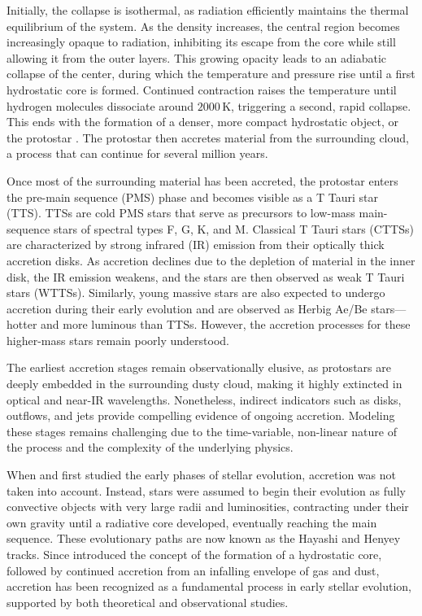 \documentclass[12pt,a4paper]{article}
\newcommand{\mr}{\mathrm}
\begin{document}
Initially, the collapse is isothermal, as radiation efficiently maintains the thermal equilibrium of the system. As the density increases, the central region becomes increasingly opaque to radiation, inhibiting its escape from the core while still allowing it from the outer layers. This growing opacity leads to an adiabatic collapse of the center, during which the temperature and pressure rise until a first hydrostatic core is formed. Continued contraction raises the temperature until hydrogen molecules dissociate around $2000\,\mr{K}$, triggering a second, rapid collapse. This ends with the formation of a denser, more compact hydrostatic object, or the protostar \parencite[e.g., ][]{StahlerPalla2004}. The protostar then accretes material from the surrounding cloud, a process that can continue for several million years. 

Once most of the surrounding material has been accreted, the protostar enters the pre-main sequence (PMS) phase and becomes visible as a T Tauri star (TTS). TTSs are cold PMS stars that serve as precursors to low-mass main-sequence stars of spectral types F, G, K, and M. Classical T Tauri stars (CTTSs) are characterized by strong infrared (IR) emission from their optically thick accretion disks. As accretion declines due to the depletion of material in the inner disk, the IR emission weakens, and the stars are then observed as weak T Tauri stars (WTTSs). Similarly, young massive stars are also expected to undergo accretion during their early evolution and are observed as Herbig Ae/Be stars—hotter and more luminous than TTSs. However, the accretion processes for these higher-mass stars remain poorly understood.

The earliest accretion stages remain observationally elusive, as protostars are deeply embedded in the surrounding dusty cloud, making it highly extincted in optical and near-IR wavelengths. Nonetheless, indirect indicators such as disks, outflows, and jets provide compelling evidence of ongoing accretion. Modeling these stages remains challenging due to the time-variable, non-linear nature of the process and the complexity of the underlying physics.

When \textcite{HenyeyEtAl1955} and \textcite{Hayashi1961} first studied the early phases of stellar evolution, accretion was not taken into account. Instead, stars were assumed to begin their evolution as fully convective objects with very large radii and luminosities, contracting under their own gravity until a radiative core developed, eventually reaching the main sequence. These evolutionary paths are now known as the Hayashi and Henyey tracks. Since \textcite{Larson1969} introduced the concept of the formation of a hydrostatic core, followed by continued accretion from an infalling envelope of gas and dust, accretion has been recognized as a fundamental process in early stellar evolution, supported by both theoretical and observational studies.
\end{document}
